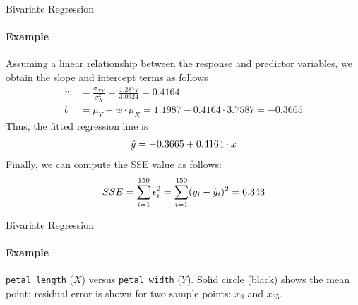 \begin{frame}{Bivariate Regression}
\framesubtitle{Example}
    Assuming a linear relationship between the response and predictor
    variables, we %
    obtain the slope and intercept terms as follows
    \begin{align*}
        w & = \frac{\sigma_{XY}}{\sigma_X^2} = \frac{1.2877}{3.0924} =
        0.4164\\
        b & = \mu_Y - w \cdot \mu_X = 1.1987 - 0.4164 \cdot 3.7587 =
        -0.3665
    \end{align*}
    Thus, the fitted regression line is
    \begin{align*}
        \hat{y} = -0.3665 + 0.4164 \cdot x
    \end{align*}
%
    Finally, we can compute the SSE value 
as follows:
    \begin{align*}
        SSE = \sum_{i=1}^{150} \epsilon_i^2 
        = \sum_{i=1}^{150} (y_i - \hat{y}_i)^2
        = 6.343
    \end{align*}
%
\end{frame}

\begin{frame}{Bivariate Regression}
\framesubtitle{Example}

{\tt petal length} ($X$) versus {\tt petal
width} ($Y$). Solid circle (black) shows the mean point; residual
error is shown for two sample points: $x_9$ and $x_{35}$.

\begin{center}
    \centering
{}
\end{center}
\end{frame}

